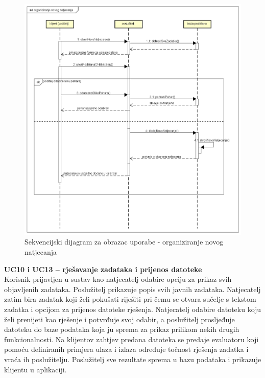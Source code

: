 				\begin{figure}[H]
					\includegraphics[scale=0.5]{dijagrami/sd17.png} 
					\centering
					\caption{Sekvencijski dijagram za obrazac uporabe - organiziranje novog natjecanja}
					\label{fig:sekvencijski2} 
				\end{figure}
				\pagebreak
				
				\noindent \textbf{UC10 i UC13 – rješavanje zadataka i prijenos datoteke}\\
				
				\noindent Korisnik prijavljen u sustav kao natjecatelj odabire opciju za prikaz svih objavljenih zadataka. Poslužitelj prikazuje popis svih javnih zadataka. Natjecatelj zatim bira zadatak koji želi pokušati riješiti pri čemu se otvara sučelje s tekstom zadatka i opcijom za prijenos datoteke rješenja. Natjecatelj odabire datoteku koju želi prenijeti kao rješenje i potvrđuje svoj odabir, a poslužitelj prosljeđuje datoteku do baze podataka koja ju sprema za prikaz prilikom nekih drugih funkcionalnosti. Na klijentov zahtjev predana datoteka se predaje evaluatoru koji pomoću definiranih primjera ulaza i izlaza određuje točnost rješenja zadatka i vraća ih poslužitelju. Poslužitelj sve rezultate sprema u bazu podataka i prikazuje klijentu u aplikaciji.
				
